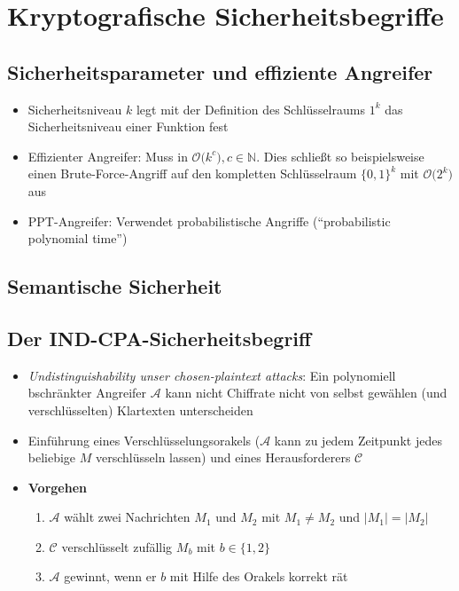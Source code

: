 \section{Kryptografische Sicherheitsbegriffe}

\subsection{Sicherheitsparameter und effiziente Angreifer}
\begin{itemize}
	\item Sicherheitsniveau \(k\) legt mit der Definition des Schlüsselraums \(1^k\) das Sicherheitsniveau einer Funktion fest
	\item Effizienter Angreifer: Muss in \(\mathcal{O}\big(k^c\big), c \in \mathbb{N}\). Dies schließt so beispielsweise einen Brute-Force-Angriff auf den kompletten Schlüsselraum \(\{0,1\}^k\) mit \(\mathcal{O}\big(2^k\big)\) aus
	\item PPT-Angreifer: Verwendet probabilistische Angriffe ("`probabilistic polynomial time"')
\end{itemize}


\subsection{Semantische Sicherheit}


\subsection{Der IND-CPA-Sicherheitsbegriff}
\begin{itemize}
	\item \textit{Undistinguishability unser chosen-plaintext attacks}: Ein polynomiell bschränkter Angreifer \(\mathcal{A}\) kann nicht Chiffrate nicht von selbst gewählen (und verschlüsselten) Klartexten unterscheiden
	\item Einführung eines Verschlüsselungsorakels (\(\mathcal{A}\) kann zu jedem Zeitpunkt jedes beliebige \(M\) verschlüsseln lassen) und eines Herausforderers \(\mathcal{C}\)
	\item \textbf{Vorgehen}
	\begin{enumerate}
		\item \(\mathcal{A}\) wählt zwei Nachrichten \(M_1\) und \(M_2\) mit \(M_1 \neq M_2\) und \(|M_1| = |M_2|\)
		\item \(\mathcal{C}\) verschlüsselt zufällig \(M_b\) mit \(b \in \{1,2\}\)
		\item \(\mathcal{A}\) gewinnt, wenn er \(b\) mit Hilfe des Orakels korrekt rät
	\end{enumerate}
\end{itemize}



